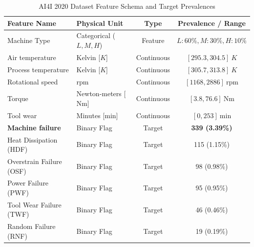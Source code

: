 \documentclass[conference]{IEEEtran}
\begin{document}
\begin{table}[h]
\caption{AI4I 2020 Dataset Feature Schema and Target Prevalences}
\centering
\begin{tabular}{llcc}
\toprule
\textbf{Feature Name} & \textbf{Physical Unit} & \textbf{Type} & \textbf{Prevalence / Range} \\
\midrule
Machine Type & Categorical ($L, M, H$) & Feature & $L: 60\%, M: 30\%, H: 10\%$ \\
Air temperature & Kelvin [$K$] & Continuous & $[295.3, 304.5]\ K$ \\
Process temperature & Kelvin [$K$] & Continuous & $[305.7, 313.8]\ K$ \\
Rotational speed & rpm & Continuous & $[1168, 2886]\ \text{rpm}$ \\
Torque & Newton-meters [$\text{Nm}$] & Continuous & $[3.8, 76.6]\ \text{Nm}$ \\
Tool wear & Minutes [$\text{min}$] & Continuous & $[0, 253]\ \text{min}$ \\
\midrule
\textbf{Machine failure} & Binary Flag & Target & \textbf{339 (3.39\%)} \\
Heat Dissipation (HDF) & Binary Flag & Target & 115 (1.15\%) \\
Overstrain Failure (OSF) & Binary Flag & Target & 98 (0.98\%) \\
Power Failure (PWF) & Binary Flag & Target & 95 (0.95\%) \\
Tool Wear Failure (TWF) & Binary Flag & Target & 46 (0.46\%) \\
Random Failure (RNF) & Binary Flag & Target & 19 (0.19\%) \\
\bottomrule
\end{tabular}
\label{tab:dataset}
\end{table}
\end{document}
